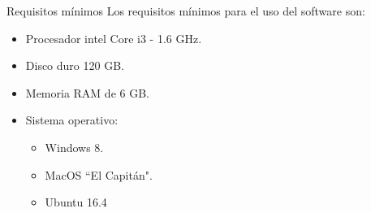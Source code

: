 \begin{frame}[t]{Requisitos mínimos}\vspace{10pt}
Los requisitos mínimos para el uso del software son:
\begin{itemize}
	\item Procesador intel Core i3 - 1.6 GHz.
	\item Disco duro 120 GB.
	\item Memoria RAM de 6 GB.
	\item Sistema operativo:
	\begin{itemize}
		\item Windows 8.
		\item MacOS ``El Capitán".
		\item Ubuntu 16.4
	\end{itemize}
\end{itemize}
\end{frame}